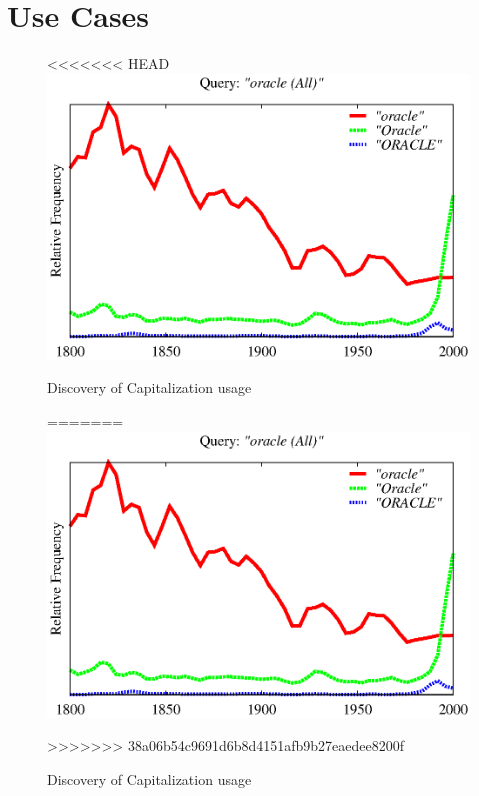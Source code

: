 \documentclass[11pt,a4paper]{article}
\begin{document}


\section{Use Cases}
\label{sec:usecases}
\begin{figure}
\centering
<<<<<<< HEAD
\includegraphics[width=0.9\columnwidth]{graphs/oracle}
\caption{\label{fig:apple} Discovery of Capitalization usage}
=======
\includegraphics[width=\columnwidth]{graphs/oracle}
\caption{\label{fig:oracle} Discovery of Capitalization usage}
>>>>>>> 38a06b54c9691d6b8d4151afb9b27eaedee8200f
\end{figure}
\end{document}

